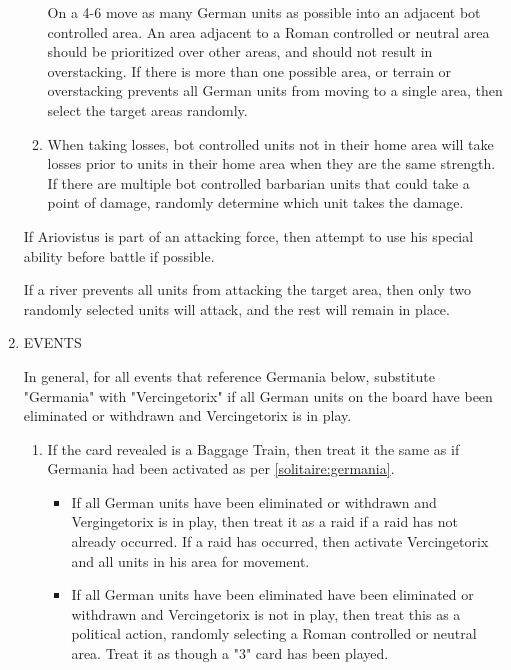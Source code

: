 \begin{enumerate}
\begin{enumerate}[leftmargin=0in]
    On a 4-6 move as many German units as possible into an adjacent bot controlled area. An area adjacent to a Roman controlled or neutral area should be prioritized over other areas, and should not result in overstacking. If there is more than one possible area, or terrain or overstacking prevents all German units from moving to a single area, then select the target areas randomly.
    
    \item When taking losses, bot controlled units not in their home area will take losses prior to units in their home area when they are the same strength. If there are multiple bot controlled barbarian units that could take a point of damage, randomly determine which unit takes the damage.
  \end{enumerate}
  
  If Ariovistus is part of an attacking force, then attempt to use his special ability before battle if possible.

  If a river prevents all units from attacking the target area, then only two randomly selected units will attack, and the rest will remain in place.

  \item EVENTS
  
  In general, for all events that reference Germania below, substitute "Germania" with "Vercingetorix" if all German units on the board have been eliminated or withdrawn and Vercingetorix is in play.
  
  \begin{enumerate}[leftmargin=0in]
    \item If the card revealed is a Baggage Train, then treat it the same as if Germania had been activated as per \ref{solitaire:germania}.
    
    \begin{itemize}
    \item If all German units have been eliminated or withdrawn and Vergingetorix is in play, then treat it as a raid if a raid has not already occurred. If a raid has occurred, then activate Vercingetorix and all units in his area for movement.
    
    \item If all German units have been eliminated have been eliminated or withdrawn and Vercingetorix is not in play, then treat this as a political action, randomly selecting a Roman controlled or neutral area. Treat it as though a "3" card has been played.
    \end{itemize}
    

\end{enumerate}
\end{enumerate}
